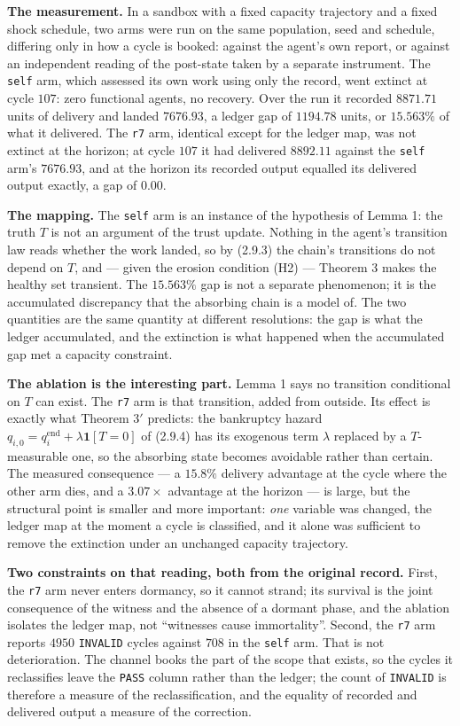 \documentclass[11pt,a4paper]{article}
\begin{document}
\textbf{The measurement.} In a sandbox with a fixed capacity trajectory and a fixed
shock schedule, two arms were run on the same population, seed and schedule,
differing only in how a cycle is booked: against the agent's own report, or against
an independent reading of the post-state taken by a separate instrument. The
\texttt{self} arm, which assessed its own work using only the record, went extinct at
cycle \(107\): zero functional agents, no recovery. Over the run it recorded
\(8871.71\) units of delivery and landed \(7676.93\), a ledger gap of \(1194.78\)
units, or \(15.563\%\) of what it delivered. The \texttt{r7} arm, identical except for the
ledger map, was not extinct at the horizon; at cycle \(107\) it had delivered
\(8892.11\) against the \texttt{self} arm's \(7676.93\), and at the horizon its recorded
output equalled its delivered output exactly, a gap of \(0.00\).

\textbf{The mapping.} The \texttt{self} arm is an instance of the hypothesis of Lemma 1: the
truth \(T\) is not an argument of the trust update. Nothing in the agent's transition
law reads whether the work landed, so by (2.9.3) the chain's transitions do not
depend on \(T\), and --- given the erosion condition (H2) --- Theorem 3 makes the healthy
set transient. The \(15.563\%\) gap is not a separate phenomenon; it is the
accumulated discrepancy that the absorbing chain is a model of. The two quantities
are the same quantity at different resolutions: the gap is what the ledger
accumulated, and the extinction is what happened when the accumulated gap met a
capacity constraint.

\textbf{The ablation is the interesting part.} Lemma 1 says no transition conditional
on \(T\) can exist. The \texttt{r7} arm is that transition, added from outside. Its effect
is exactly what Theorem 3\('\) predicts: the bankruptcy hazard
\(q_{i,0}=q^{\mathrm{end}}_{i}+\lambda\mathbf 1[T=0]\) of (2.9.4) has its exogenous
term \(\lambda\) replaced by a \(T\)-measurable one, so the absorbing state becomes
avoidable rather than certain. The measured consequence --- a \(15.8\%\) delivery
advantage at the cycle where the other arm dies, and a \(3.07\times\) advantage at
the horizon --- is large, but the structural point is smaller and more important:
\emph{one} variable was changed, the ledger map at the moment a cycle is classified, and
it alone was sufficient to remove the extinction under an unchanged capacity
trajectory.

\textbf{Two constraints on that reading, both from the original record.} First, the
\texttt{r7} arm never enters dormancy, so it cannot strand; its survival is the joint
consequence of the witness and the absence of a dormant phase, and the ablation
isolates the ledger map, not ``witnesses cause immortality''. Second, the \texttt{r7} arm
reports \(4950\) \texttt{INVALID} cycles against \(708\) in the \texttt{self} arm. That is not
deterioration. The channel books the part of the scope that exists, so the cycles
it reclassifies leave the \texttt{PASS} column rather than the ledger; the count of
\texttt{INVALID} is therefore a measure of the reclassification, and the equality of
recorded and delivered output a measure of the correction.
\end{document}
